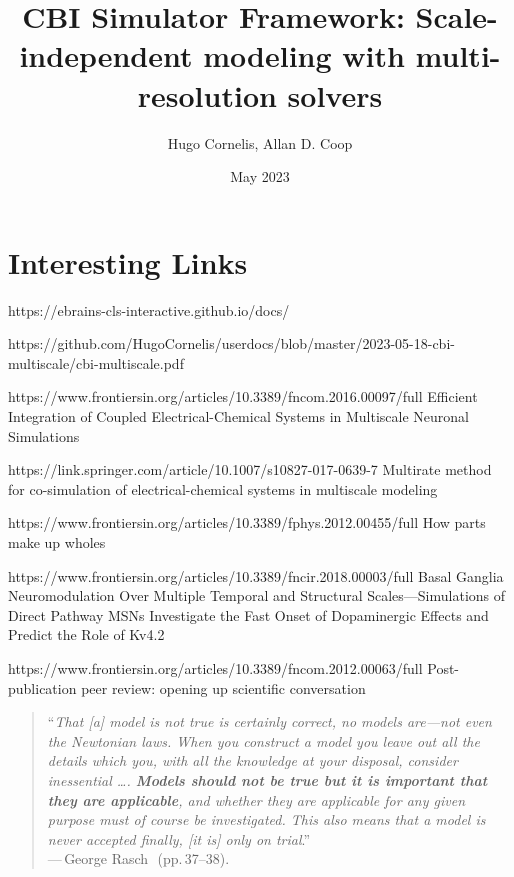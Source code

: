 \documentclass{article}
\title{CBI Simulator Framework: Scale-independent modeling with multi-resolution solvers}
\author{Hugo Cornelis, Allan D. Coop}
\date{May 2023}
\begin{document}
\maketitle

\section*{Interesting Links}

https://ebrains-cls-interactive.github.io/docs/

https://github.com/HugoCornelis/userdocs/blob/master/2023-05-18-cbi-multiscale/cbi-multiscale.pdf


https://www.frontiersin.org/articles/10.3389/fncom.2016.00097/full
Efficient Integration of Coupled Electrical-Chemical Systems in Multiscale Neuronal Simulations

https://link.springer.com/article/10.1007/s10827-017-0639-7
Multirate method for co-simulation of electrical-chemical systems in multiscale modeling

https://www.frontiersin.org/articles/10.3389/fphys.2012.00455/full
How parts make up wholes

https://www.frontiersin.org/articles/10.3389/fncir.2018.00003/full
Basal Ganglia Neuromodulation Over Multiple Temporal and Structural Scales—Simulations of Direct Pathway MSNs Investigate the Fast Onset of Dopaminergic Effects and Predict the Role of Kv4.2

https://www.frontiersin.org/articles/10.3389/fncom.2012.00063/full
Post-publication peer review: opening up scientific conversation
\begin{quote}
    ``\small{\textit{That \textnormal{[a]} model is not true is certainly correct, no models are—not even the Newtonian laws. When you construct a model you leave out all the details which you, with all the knowledge at your disposal, consider inessential \ldots. \textbf{Models should not be true but it is important that they are applicable}, and whether they are applicable for any given purpose must of course be investigated. This also means that a model is never accepted finally, \textnormal{[it is]} only on trial}.''\\
    ---\,George Rasch~\citep{rasch80}}\,(pp.\,37--38).
\end{quote}


\end{document}
